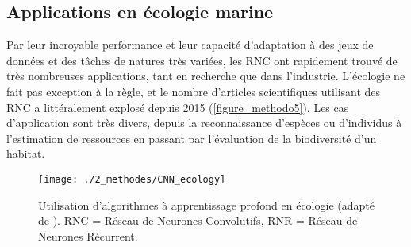 \medskip

\setlength{\fboxsep}{5pt}
\setlength{\fboxrule}{0.6pt}
\noindent{}

\subsection{Applications en écologie marine}

Par leur incroyable performance et leur capacité d’adaptation à des jeux de données et des tâches de natures très variées, les RNC ont rapidement trouvé de très nombreuses applications, tant en recherche que dans l’industrie. L’écologie ne fait pas exception à la règle, et le nombre d’articles scientifiques utilisant des RNC a littéralement explosé depuis 2015 \citep{christin_applications_2019} (\autoref{figure_methodo5}). Les cas d’application sont très divers, depuis la reconnaissance d’espèces ou d’individus à l’estimation de ressources en passant par l’évaluation de la biodiversité d’un habitat.

\begin{figure}[H]
	\begin{center}
	\texttt{[image: ./2\_methodes/CNN\_ecology]}
		\caption[Utilisation d’algorithmes à apprentissage profond en écologie]{Utilisation d’algorithmes à apprentissage profond en écologie (adapté de \citet{christin_applications_2019}). RNC = Réseau de Neurones Convolutifs, RNR = Réseau de Neurones Récurrent.}
	\label{figure_methodo5}
\end{center}
\end{figure}

